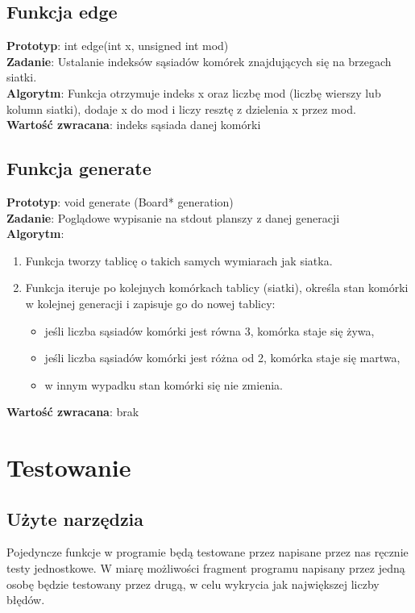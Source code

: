 \documentclass[12pt,a4paper,notitlepage]{report}
\begin{document}
\subsection{Funkcja edge}
\textbf {Prototyp}: int edge(int x, unsigned int mod)\\
\textbf {Zadanie}: Ustalanie indeksów sąsiadów komórek znajdujących się na brzegach siatki.
\\
\textbf {Algorytm}:
Funkcja otrzymuje indeks x oraz liczbę mod (liczbę wierszy lub kolumn siatki), dodaje x do mod i liczy resztę z dzielenia x przez mod.\\
\textbf {Wartość zwracana}: indeks sąsiada danej komórki     

\subsection{Funkcja generate}
\textbf {Prototyp}: void generate (Board* generation)\\
\textbf {Zadanie}: Poglądowe wypisanie na stdout planszy z danej generacji\\
\textbf {Algorytm}:
\begin{enumerate} 
\item Funkcja tworzy tablicę o takich samych wymiarach jak siatka.
\item Funkcja iteruje po kolejnych komórkach tablicy (siatki), określa stan komórki w kolejnej generacji i zapisuje go do nowej tablicy:
\begin{itemize}
\item jeśli liczba sąsiadów komórki jest równa 3, komórka staje się żywa, 
\item jeśli liczba sąsiadów komórki jest różna od 2, komórka staje się martwa,
\item w innym wypadku stan komórki się nie zmienia.
\end{itemize}
	
\end{enumerate}
\textbf {Wartość zwracana}: brak


\section{Testowanie}
\subsection{Użyte narzędzia}

Pojedyncze funkcje w programie będą testowane przez napisane przez nas ręcznie testy jednostkowe. W miarę możliwości fragment programu napisany przez jedną osobę będzie testowany przez drugą, w celu wykrycia jak największej liczby błędów.
\end{document}
